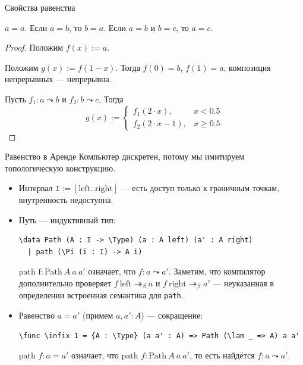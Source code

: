 \documentclass[aspectratio=169]{beamer}
\begin{document}
\begin{frame}{Свойства равенства}
\begin{thm}
$a = a$.
Если $a = b$, то $b = a$.
Если $a = b$ и $b = c$, то $a = c$.
\end{thm}
\begin{proof}
Положим $f(x) := a$.

Положим $g(x) := f(1 - x)$. Тогда $f(0) = b$, $f(1) = a$, композиция непрерывных --- непрерывна.

Пусть $f_1: a \leadsto b$ и $f_2: b \leadsto c$.
Тогда $$g(x) := \left\{\begin{array}{ll}f_1(2\cdot x),& x < 0.5\\f_2(2\cdot x -1),& x\ge 0.5\end{array}\right.$$
\end{proof}
\end{frame}

\begin{frame}[fragile]{Равенство в Аренде}
Компьютер дискретен, потому мы имитируем топологическую конструкцию.
\begin{itemize}
\item Интервал $\texttt{I} := [\text{left}..\text{right}]$ --- есть доступ только к граничным точкам, внутренность недоступна.
\item Путь --- индуктивный тип:
\small\color[HTML]{025002}\begin{verbatim}
\data Path (A : I -> \Type) (a : A left) (a' : A right)
  | path (\Pi (i : I) -> A i)
\end{verbatim}\normalsize
\color{black}

$\text{path f}:\text{Path}\ A\ a\ a'$  означает, что $f: a \leadsto a'$.
Заметим, что компилятор дополнительно проверяет $f\ \text{left}\twoheadrightarrow_\beta a$ и $f\ \text{right}\twoheadrightarrow_\beta a'$ --- 
неуказанная в определении встроенная семантика для \verb!path!.
\item Равенство $a = a'$ (примем $a,a':A$) --- сокращение:
\small\color[HTML]{025002}\begin{verbatim}
\func \infix 1 = {A : \Type} (a a' : A) => Path (\lam _ => A) a a'
\end{verbatim}\normalsize
\color{black}

$\text{path }f : a = a'$ означает, что $\text{path }f:\text{Path}\ A\ a\ a'$, то есть найдётся $f : a \leadsto a'$.
\end{itemize}
\end{frame}
\end{document}
